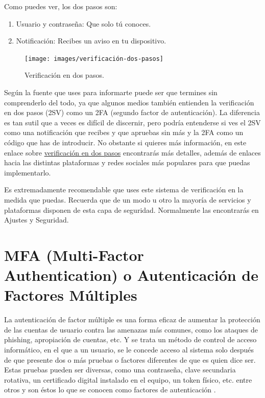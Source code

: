 \documentclass[
  a4paper,
  openany]{book}
\providecommand{\tightlist}{%
  \setlength{\itemsep}{0pt}\setlength{\parskip}{0pt}}
\begin{document}
Como puedes ver, los dos pasos son:

\begin{enumerate}
\def\labelenumi{\arabic{enumi}.}
\tightlist
\item
  Usuario y contraseña: Que solo tú conoces.
\item
  Notificación: Recibes un aviso en tu dispositivo.
\end{enumerate}

\begin{figure}

{\centering \texttt{[image: images/verificación-dos-pasos]} 

}

\caption{Verificación en dos pasos.}\label{fig:unnamed-chunk-13}
\end{figure}

Según la fuente que uses para informarte puede ser que termines sin comprenderlo del todo, ya que algunos medios también entienden la verificación en dos pasos (2SV) como un 2FA (segundo factor de autenticación). La diferencia es tan sutil que a veces es difícil de discernir, pero podría entenderse si ves el 2SV como una notificación que recibes y que apruebas sin más y la 2FA como un código que has de introducir. No obstante si quieres más información, en este enlace sobre \href{https://www.osi.es/es/actualidad/blog/2017/01/17/verificacion-en-dos-pasos-que-es-y-como-me-puede-ayudar}{verificación en dos pasos} encontrarás más detalles, además de enlaces hacia las distintas plataformas y redes sociales más populares para que puedas implementarlo.

Es extremadamente recomendable que uses este sistema de verificación en la medida que puedas. Recuerda que de un modo u otro la mayoría de servicios y plataformas disponen de esta capa de seguridad. Normalmente las encontrarás en Ajustes y Seguridad.

\hypertarget{mfa-multi-factor-authentication-o-autenticaciuxf3n-de-factores-muxfaltiples}{%
\section{MFA (Multi-Factor Authentication) o Autenticación de Factores Múltiples}\label{mfa-multi-factor-authentication-o-autenticaciuxf3n-de-factores-muxfaltiples}}

La autenticación de factor múltiple es una forma eficaz de aumentar la protección de las cuentas de usuario contra las amenazas más comunes, como los ataques de phishing, apropiación de cuentas, etc. Y se trata un método de control de acceso informático, en el que a un usuario, se le concede acceso al sistema solo después de que presente dos o más pruebas o factores diferentes de que es quien dice ser. Estas pruebas pueden ser diversas, como una contraseña, clave secundaria rotativa, un certificado digital instalado en el equipo, un token físico, etc. entre otros y son éstos lo que se conocen como factores de autenticación \citep{WIKI-multiple-factor}.
\end{document}
